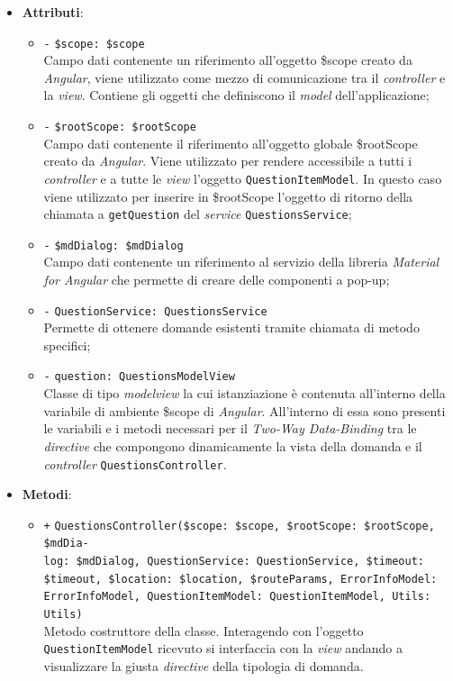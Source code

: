 \begin{itemize}
\begin{itemize}
	\end{itemize}
	\item \textbf{Attributi}:
	\begin{itemize}
		\item \texttt{-} \texttt{\$scope: \$scope} \\
		Campo dati contenente un riferimento all'oggetto \$scope creato da \textit{Angular}, viene utilizzato come mezzo di comunicazione tra il \textit{controller} e la \textit{view}. Contiene gli oggetti che definiscono il \textit{model} dell'applicazione;
		\item \texttt{-} \texttt{\$rootScope: \$rootScope} \\
		Campo dati contenente il riferimento all'oggetto globale \$rootScope creato da \textit{Angular}. Viene utilizzato per rendere accessibile a tutti i \textit{controller} e a tutte le \textit{view} l'oggetto \texttt{QuestionItemModel}. In questo caso viene utilizzato per inserire in \$rootScope l'oggetto di ritorno della chiamata a \texttt{getQuestion} del \textit{service} \texttt{QuestionsService};
		\item \texttt{-} \texttt{\$mdDialog: \$mdDialog} \\
		Campo dati contenente un riferimento al servizio della libreria \textit{Material for Angular} che permette di creare delle componenti a pop-up;
		\item \texttt{-} \texttt{QuestionService: QuestionsService}\\ Permette di ottenere domande esistenti tramite chiamata di metodo specifici;
		\item \texttt{-} \texttt{question: QuestionsModelView} \\
		Classe di tipo \textit{modelview} la cui istanziazione è contenuta all'interno della variabile di ambiente \$scope di \textit{Angular}. All'interno di essa sono presenti le variabili e i metodi necessari per il \textit{Two-Way Data-Binding} tra le \textit{directive} che compongono dinamicamente la vista della domanda e il \textit{controller} \texttt{QuestionsController}.
	\end{itemize}
	\item \textbf{Metodi}:
	\begin{itemize}
		\item \texttt{+} \texttt{QuestionsController(\$scope: \$scope, \$rootScope: \$rootScope, \$mdDia-\\log: \$mdDialog, QuestionService: QuestionService, \$timeout: \$timeout, \$location: \$location, \$routeParams, ErrorInfoModel: ErrorInfoModel, QuestionItemModel: QuestionItemModel, Utils: Utils)} \\ Metodo costruttore della classe. Interagendo con l'oggetto \texttt{QuestionItemModel} ricevuto si interfaccia con la \textit{view} andando a visualizzare la giusta \textit{directive} della tipologia di domanda. \\

\end{itemize}
\end{itemize}
